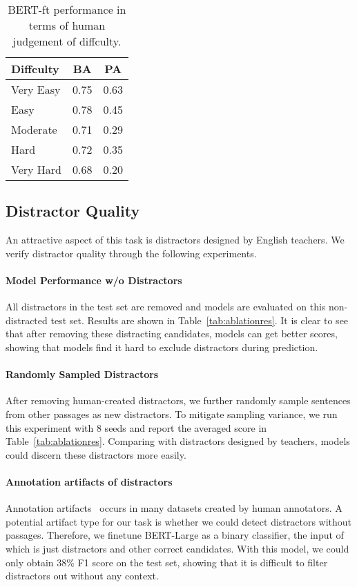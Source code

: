 \documentclass[11pt,a4paper]{article}
\begin{document}
\begin{table}[!ht]
    \centering
    \begin{tabular}{l|c|c}
        \toprule
        Diffculty &  BA & PA\\
        \midrule
        Very Easy & 0.75 & 0.63 \\
        Easy & 0.78 & 0.45\\
        Moderate & 0.71 & 0.29\\
        Hard & 0.72 & 0.35\\
        Very Hard & 0.68 & 0.20\\
        \bottomrule
    \end{tabular}
    \caption{BERT-ft performance in terms of human judgement of diffculty.}
    \label{tab:diffculty_corr}
\end{table}
\subsection{Distractor Quality} \label{sec:discQuality}
An attractive aspect of this task is distractors designed by English teachers. We verify distractor quality through the following experiments.
\paragraph{Model Performance w/o Distractors} All distractors in the test set are removed and models are evaluated on this non-distracted test set. Results are shown in Table~\ref{tab:ablationres}. It is clear to see that after removing these distracting candidates, models can get better scores, showing that models find it hard to exclude distractors during prediction.
\paragraph{Randomly Sampled Distractors} After removing human-created distractors, we further randomly sample sentences from other passages as new distractors. To mitigate sampling variance, we run this experiment with 8 seeds and report the averaged score in Table~\ref{tab:ablationres}. Comparing with distractors designed by teachers, models could discern these distractors more easily.
\paragraph{Annotation artifacts of distractors} Annotation artifacts~\cite{gururangan2018annotation} occurs in many datasets created by human annotators. A potential artifact type for our task is whether we could detect distractors without passages.  Therefore, we finetune BERT-Large as a binary classifier, the input of which is just distractors and other correct candidates. With this model, we could only obtain 38\% F1 score on the test set, showing that it is difficult to filter distractors out without any context.
\end{document}
